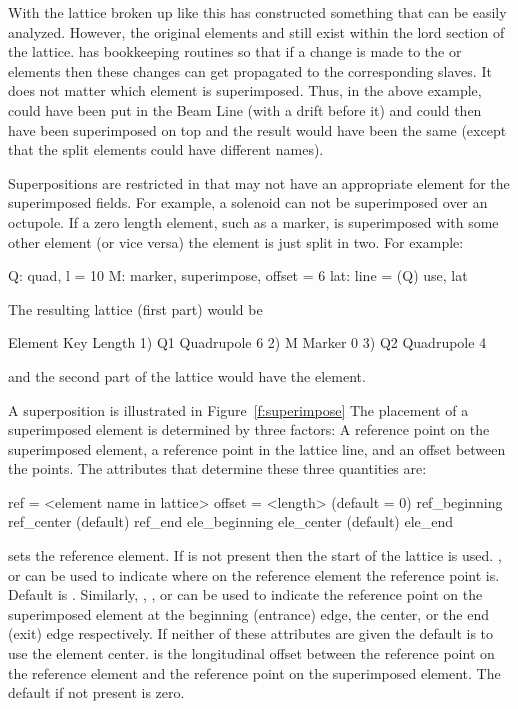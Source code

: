 With the lattice broken up like this \bmad has constructed something
that can be easily analyzed. However, the original elements  and
 still exist within the lord section of the lattice. \bmad has
bookkeeping routines so that if a change is made to the  or
 elements then these changes can get propagated to the
corresponding slaves.  It does not matter which element is
superimposed. Thus, in the above example,  could have been put
in the Beam Line (with a drift before it) and  could then have
been superimposed on top and the result would have been the same
(except that the split elements could have different names).

Superpositions are restricted in that \bmad may not have an
appropriate element for the superimposed fields. For example, a
solenoid can not be superimposed over an octupole.  If a zero length
element, such as a marker, is superimposed with some other element (or
vice versa) the element is just split in two. For example:
\begin{example}
  Q: quad, l = 10
  M: marker, superimpose, offset = 6
  lat: line = (Q)
  use, lat
\end{example}
The resulting lattice (first part) would be
\begin{example}
        Element   Key           Length
  1)    Q{\B}1       Quadrupole    6
  2)    M         Marker        0
  3)    Q{\B}2       Quadrupole    4
\end{example}
and the second part of the lattice would have the  element.
 
A superposition is illustrated in Figure~\ref{f:superimpose} The
placement of a superimposed element is determined by three factors: A
reference point on the superimposed element, a reference point in the
lattice line, and an offset between the points. The attributes that
determine these three quantities are: 
\begin{example}
  ref = <element name in lattice>
  offset = <length>      (default = 0)
  ref_beginning
  ref_center             (default)
  ref_end
  ele_beginning
  ele_center             (default)
  ele_end
\end{example}
 sets the reference element. If  is not present then
the start of the lattice is used. , 
or  can be used to indicate where on the reference element
the reference point is. Default is . Similarly,
, , or  can be used to
indicate the reference point on the superimposed element at the
beginning (entrance) edge, the center, or the end (exit) edge
respectively. If neither of these attributes are given the default is
to use the element center.  is the longitudinal offset
between the reference point on the reference element and the reference
point on the superimposed element. The default if not present is zero.

